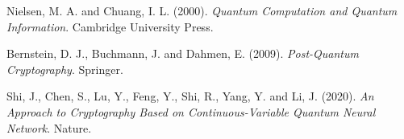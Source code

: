 \documentclass[%
    corpo=11pt,
    twoside,
    stile=classica,
    oldstyle,
    autoretitolo,
    tipotesi=magistrale,
    greek,
    evenboxes,
    english
]{toptesi}
\begin{document}
\begin{thebibliography}{99}
 {\sc Nielsen, M. A.} and {\sc Chuang, I. L.} (2000). \textit{Quantum Computation and Quantum Information}. Cambridge University Press.

 {\sc Bernstein, D. J.}, {\sc Buchmann, J.} and {\sc Dahmen, E.} (2009). \textit{Post-Quantum Cryptography}. Springer.

 {\sc Shi, J.}, {\sc Chen, S.}, {\sc Lu, Y.}, {\sc Feng, Y.}, {\sc Shi, R.}, {\sc Yang, Y.} and {\sc Li, J.} (2020). \textit{An Approach to Cryptography Based on Continuous-Variable Quantum Neural Network}. Nature.

\end{thebibliography}
\end{document}
